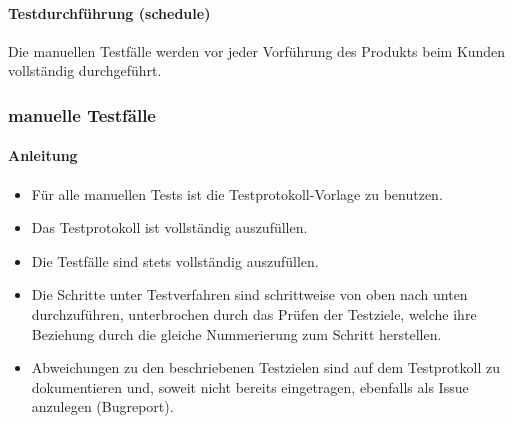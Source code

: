 \paragraph{Testdurchführung (schedule)}
Die manuellen Testfälle werden vor jeder Vorführung des Produkts beim Kunden vollständig durchgeführt.

\subsubsection{manuelle Testfälle}\label{QS:Test:Manuelle_Testfaelle}
\paragraph{Anleitung}
\begin{itemize}
\item Für alle manuellen Tests ist die Testprotokoll-Vorlage zu benutzen.
\item Das Testprotokoll ist vollständig auszufüllen.
\item Die Testfälle sind stets vollständig auszufüllen.
\item Die Schritte unter Testverfahren sind schrittweise von oben nach unten durchzuführen, unterbrochen durch das Prüfen der Testziele, welche ihre Beziehung durch die gleiche Nummerierung zum Schritt herstellen.
\item Abweichungen zu den beschriebenen Testzielen sind auf dem Testprotkoll zu dokumentieren und, soweit nicht bereits eingetragen, ebenfalls als Issue anzulegen (Bugreport).
\end{itemize}
